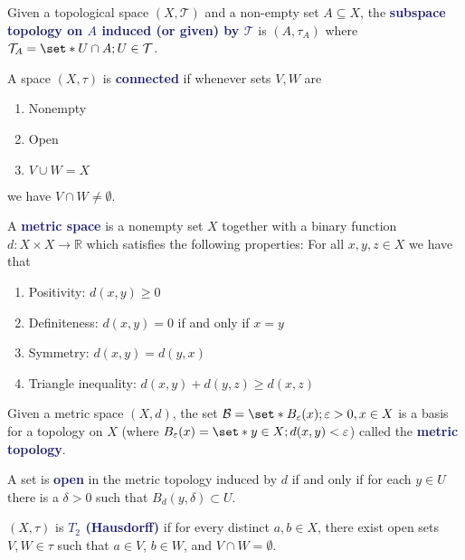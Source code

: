 \documentclass[11pt]{article}
\numberwithin{equation}{section}
\newcommand{\navy}[1]{\textcolor{MidnightBlue}{\bf #1}}
\theoremstyle{definition}
\theoremstyle{definition}
\def\Set{\set*}%
\def\ss{\subset}
\def\sse{\subseteq}
\newcommand{\1}{\mathbbm 1}
\def\d{\delta}
\def\t{\tau}
\newcommand{\e}{\varepsilon}
\newcommand{\RR}{\mathbb R}
\newcommand{\tT}{\mathcal T}
\newcommand{\bB}{\mathcal B}
\begin{document}
\begin{definition}
Given a topological space $(X,\tT)$ and a non-empty set $A \sse X$, the \navy{subspace topology on $A$ induced (or given) by $\tT$} is $(A, \t_A)$ where $\tT_A = \Set{U \cap A; U \in \tT}$.
\end{definition}

\begin{definition}[Connected]
A space $(X,\t)$ is \navy{connected} if whenever sets $V,W$ are
\begin{enumerate}
\item Nonempty
\item Open
\item $V \cup W = X$
\end{enumerate}
we have $V \cap W \neq \emptyset$.
\end{definition}

\begin{definition}
A \navy{metric space} is a nonempty set $X$ together with a binary function $d : X\times X \to \RR$ which satisfies the following properties: For all $x,y,z \in X$ we have that
\begin{enumerate}
\item Positivity: $d(x,y) \geq 0$
\item Definiteness: $d(x,y) = 0$ if and only if $x=y$
\item Symmetry: $d(x,y) = d(y,x)$
\item Triangle inequality: $d(x,y) + d(y,z) \geq d(x,z)$
\end{enumerate}
\end{definition}

\begin{definition}
Given a metric space $(X,d)$, the set $\bB = \Set{B_\e(x); \e > 0, x \in X}$ is a basis for a topology on $X$ (where $B_\e(x) = \Set{y \in X; d(x,y) < \e}$) called the \navy{metric topology}.
\end{definition}

\begin{definition}
A set is \navy{open} in the metric topology induced by $d$ if and only if for each $y \in U$ there is a $\d > 0$ such that $B_d(y, \d) \ss U$.
\end{definition}

\begin{definition}[$T_2$, Hausdorff]
$(X,\t)$ is \navy{$T_2$ (Hausdorff)} if for every distinct $a,b \in X$, there exist open sets $V,W \in \t$ such that $a \in V$, $b \in W$, and $V \cap W = \emptyset$.
\end{definition}
\end{document}
